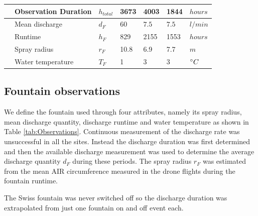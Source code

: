 \documentclass[utf8]{frontiersSCNS} %
\begin{document}
\begin{table}
\begin{tabular}{@{}|lllllll|@{}}
		\multicolumn{1}{|l|}{} & Observation Duration        & $h_{total} $    & 3673          & 4003
		                       & 1844                        & $hours$                                                                     \\\bottomrule
		\multicolumn{1}{|l|}{\multirow{4}{*}{\rotatebox[origin=c]{90}{Fountain}}}
		                       & Mean discharge              & $d_F     $      & $60$          & $7.5$        &
		$7.5$                  & $l/min$                                                                                                   \\
		\multicolumn{1}{|l|}{} & Runtime                     & $h_F $          & 829           & 2155
		                       & 1553                        & $hours$                                                                     \\
		\multicolumn{1}{|l|}{} & Spray radius                & $r_{F}$         & 10.8          & 6.9
		                       & 7.7                         & $m$                                                                         \\
		\multicolumn{1}{|l|}{} & Water temperature           & $T_{F}$         & 1             & 3
		                       & 3                           & $\degree C$                                                                 \\\midrule
	\end{tabular}
\end{table}


\subsection{Fountain observations}

We define the fountain used through four attributes, namely its spray radius, mean discharge quantity, discharge
runtime and water temperature as shown in Table \ref{tab:Observations}. Continuous measurement of the discharge
rate was unsuccessful in all the sites. Instead the discharge duration was first determined and then the
available discharge measurement was used to determine the average discharge quantity $d_F$ during these periods.
The spray radius $r_F$ was estimated from the mean AIR circumference measured in the drone flights during the
fountain runtime.

The Swiss fountain was never switched off so the discharge duration was extrapolated from just one fountain on
and off event each.
\end{document}
